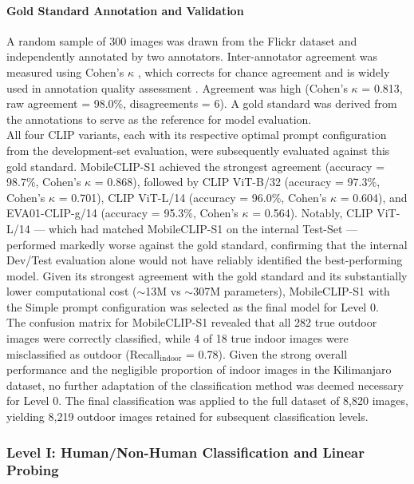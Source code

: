 \documentclass[hidelinks, 11pt]{article}
\begin{document}
\paragraph{Gold Standard Annotation and Validation}
A random sample of 300 images was drawn from the Flickr dataset and independently annotated by two annotators. Inter-annotator agreement was measured using Cohen's $\kappa$ \citep{cohen_coefficient_1960}, which corrects for chance agreement and is widely used in annotation quality assessment \citep{artstein_survey_2008,cardoso_classifying_2022}. Agreement was high (Cohen's $\kappa$ = 0.813, raw agreement = 98.0\%, disagreements = 6). A gold standard was derived from the annotations to serve as the
reference for model evaluation.
\\
All four CLIP variants, each with its respective optimal prompt configuration from the development-set evaluation, were subsequently evaluated against this gold standard. MobileCLIP-S1 achieved the strongest
agreement (accuracy = 98.7\%, Cohen's $\kappa$ = 0.868), followed by CLIP ViT-B/32 (accuracy = 97.3\%, Cohen's $\kappa$ = 0.701), CLIP ViT-L/14 (accuracy = 96.0\%, Cohen's $\kappa$ = 0.604), and EVA01-CLIP-g/14
(accuracy = 95.3\%, Cohen's $\kappa$ = 0.564). Notably, CLIP ViT-L/14 — which had matched MobileCLIP-S1 on the internal Test-Set — performed markedly worse against the gold standard, confirming that the internal Dev/Test evaluation alone would not have reliably identified the best-performing model. Given its strongest agreement with the gold standard and its substantially lower computational cost ($\sim$13M vs
$\sim$307M parameters), MobileCLIP-S1 with the Simple prompt configuration was selected as the final model for Level 0.
\\
The confusion matrix for MobileCLIP-S1 revealed that all 282 true outdoor images were correctly classified, while 4 of 18 true indoor images were misclassified as outdoor (Recall$_{\mathrm{indoor}}$ = 0.78). Given the
strong overall performance and the negligible proportion of indoor images in the Kilimanjaro dataset, no further adaptation of the classification method was deemed necessary for Level 0. The final classification was applied to the full dataset of 8,820 images, yielding 8,219 outdoor images retained for subsequent classification levels.


\subsubsection{Level I: Human/Non-Human Classification and Linear Probing}
\end{document}

